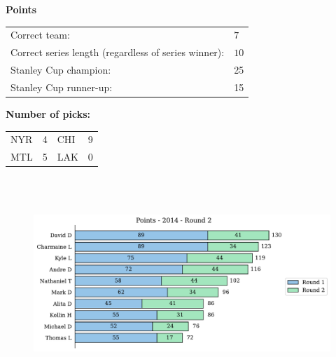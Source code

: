 \documentclass[10pt]{article}
\begin{document}
{\bf Points}\\
\begin{minipage}[t]{12cm}
    \vspace{0pt}
    \begin{tabular}{l l}
        Correct team:	& $7$\\
        Correct series length (regardless of series winner):	& $10$\\
        Stanley Cup champion:	& 25\\
        Stanley Cup runner-up:	& 15\\
    \end{tabular}

    \vspace{0.5cm}
    {\bf Number of picks:}\\
    \begin{tabular}{lc | lc }
        NYR & 4 & CHI & 9 \\
        MTL & 5 & LAK & 0 \\
    \end{tabular}
\end{minipage}
%
\begin{minipage}[t]{13cm}
    \vspace{0pt}
    \begin{figure}[H]
        \vspace{-1cm}
        \includegraphics[width=12cm,height=8cm,keepaspectratio]{../../figures/2014/Points-2014-Round2.pdf}
    \end{figure}
\end{minipage}
\end{document}
